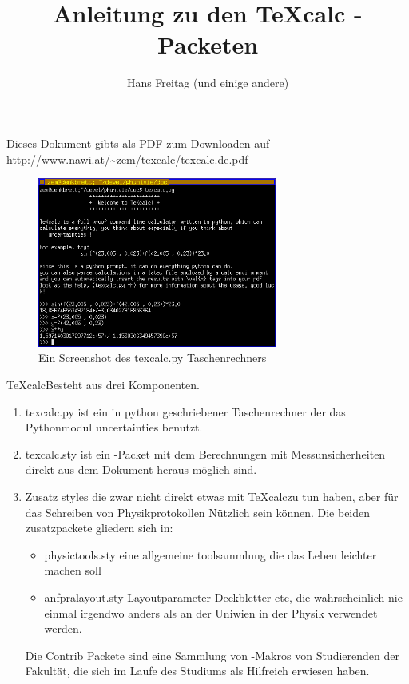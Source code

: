\documentclass[a4paper]{article}
\newcommand{\texcalc}{{\TeX}calc}
\begin{document}
\title{Anleitung zu den {\TeX}calc \LaTeXe-Packeten}
\author{Hans Freitag (und einige andere)}
\maketitle 

Dieses Dokument gibts als PDF zum Downloaden auf \url{http://www.nawi.at/~zem/texcalc/texcalc.de.pdf}

\begin{figure}[h]
\centering
\includegraphics[width=0.7\textwidth]{texcalc.png}
\caption{Ein Screenshot des texcalc.py Taschenrechners}
\label{fig:texcalc.py}
\end{figure}

\texcalc Besteht aus drei Komponenten. 

\begin{enumerate}
\item texcalc.py ist ein in python geschriebener Taschenrechner der das Pythonmodul 
		uncertainties benutzt.
\item texcalc.sty ist ein \LaTeXe-Packet mit dem Berechnungen mit Messunsicherheiten 
		direkt aus dem \LaTeXe Dokument heraus möglich sind. 
\item Zusatz styles die zwar nicht direkt etwas mit \texcalc zu tun haben, aber für 
		das Schreiben von Physikprotokollen Nützlich sein können. Die beiden zusatzpackete 
		gliedern sich in:
	\begin{itemize}
	\item physictools.sty eine allgemeine toolsammlung die das Leben leichter machen soll
	\item anfpralayout.sty Layoutparameter Deckbletter etc, die wahrscheinlich nie einmal 
		irgendwo anders als an der Uniwien in der Physik verwendet werden. 
	\end{itemize}
	Die Contrib Packete sind eine Sammlung von \LaTeXe-Makros von Studierenden der Fakultät, 
	die sich im Laufe des Studiums als Hilfreich erwiesen haben. 
\end{enumerate}
\end{document}
